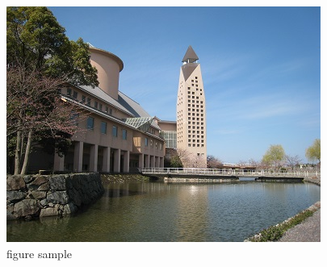\documentclass[uplatex,11pt,a4j]{jsarticle}
\begin{document}
\begin{figure}[htbp]
  \centering
  \includegraphics[width=0.5\hsize]{./figures/kendai_a22.jpg}
  \caption{figure sample}
  \label{fig:sample}
\end{figure}
\end{document}

